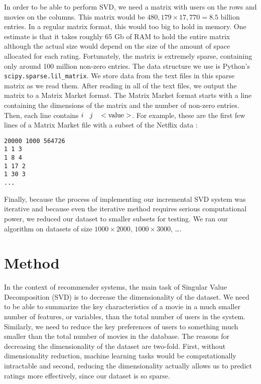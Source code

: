 \documentclass{article} %
\begin{document}
In order to be able to perform SVD, we need a matrix with users on the rows and movies on the columns.
This matrix would be $480,179 \times 17,770 = 8.5 \textrm{ billion}$ entries.
In a regular matrix format, this would too big to hold in memory. One estimate is that it takes roughly 65 Gb of RAM to hold the entire matrix \citep{revoR} although the actual size would depend on the size of the amount of space allocated for each rating.
Fortunately, the matrix is extremely sparse, containing only around 100 million non-zero entries.
The data structure we use is Python's \verb!scipy.sparse.lil_matrix!.
We store data from the text files in this sparse matrix as we read them.
After reading in all of the text files, we output the matrix to a Matrix Market format.
The Matrix Market format starts with a line containing the dimensions of the matrix and the number of non-zero entries.
Then, each line contains $i \hspace{2ex} j \hspace{2ex} <\textrm{value}>$.
For example, these are the first few lines of a Matrix Market file with a subset of the Netflix data :
\begin{verbatim}
20000 1000 564726
1 1 3
1 8 4
1 17 2
1 30 3
...
\end{verbatim}

Finally, because the process of implementing our incremental SVD system was iterative and because even the iterative method requires serious computational power, we reduced our dataset to smaller subsets for testing.
We ran our algorithm on datasets of size $1000 \times 2000$, $1000 \times 3000$, \ldots.

\section{Method}
In the context of recommender systems, the main task of Singular Value Decomposition (SVD) is to decrease the dimensionality of the dataset.
We need to be able to summarize the key characteristics of a movie in a much smaller number of features, or variables, than the total number of users in the system.
Similarly, we need to reduce the key preferences of users to something much smaller than the total number of movies in the database.
The reasons for decreasing the dimensionality of the dataset are two-fold.
First, without dimensionality reduction, machine learning tasks would be computationally intractable and second, reducing the dimensionality actually allows us to predict ratings more effectively, since our dataset is so sparse.
\end{document}
